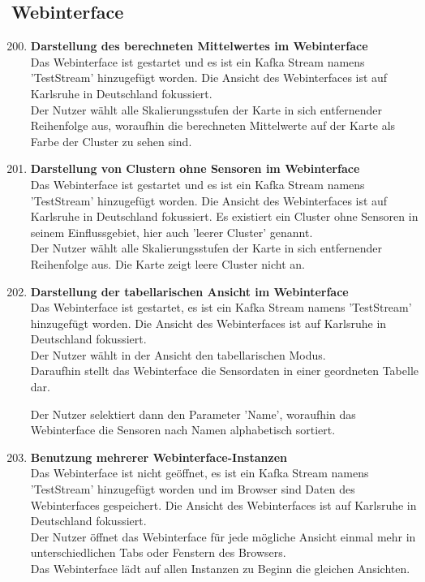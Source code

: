 \subsection{Webinterface}
\begin{enumerate}[label=\textbf{TI\arabic{enumi}0}]
	\setcounter{enumi}{199}
	
	\item \textbf{Darstellung des berechneten Mittelwertes im Webinterface}\\
		Das Webinterface ist gestartet und es ist ein Kafka Stream namens 'TestStream' hinzugefügt worden. Die Ansicht des Webinterfaces ist auf Karlsruhe in Deutschland fokussiert.\\
		Der Nutzer wählt alle Skalierungsstufen der Karte in sich entfernender Reihenfolge aus, woraufhin die berechneten Mittelwerte auf der Karte als Farbe der Cluster zu sehen sind.\par
	\item \textbf{Darstellung von Clustern ohne Sensoren im Webinterface}\\
		Das Webinterface ist gestartet und es ist ein Kafka Stream namens 'TestStream' hinzugefügt worden. Die Ansicht des Webinterfaces ist auf Karlsruhe in Deutschland fokussiert. Es existiert ein Cluster ohne Sensoren in seinem Einflussgebiet, hier auch 'leerer Cluster' genannt.\\
		Der Nutzer wählt alle Skalierungsstufen der Karte in sich entfernender Reihenfolge aus. Die Karte zeigt leere Cluster nicht an.\par
	\item \textbf{Darstellung der tabellarischen Ansicht im Webinterface}\\
		Das Webinterface ist gestartet, es ist ein Kafka Stream namens 'TestStream' hinzugefügt worden. Die Ansicht des Webinterfaces ist auf Karlsruhe in Deutschland fokussiert.\\
		Der Nutzer wählt in der Ansicht den tabellarischen Modus.\\
		Daraufhin stellt das Webinterface die Sensordaten in einer geordneten Tabelle dar.\par
		
		Der Nutzer selektiert dann den Parameter 'Name', woraufhin das Webinterface die Sensoren nach Namen alphabetisch sortiert.
	\item \textbf{Benutzung mehrerer Webinterface-Instanzen}\\
		Das Webinterface ist nicht geöffnet, es ist ein Kafka Stream namens 'TestStream' hinzugefügt worden und im Browser sind Daten des Webinterfaces gespeichert. Die Ansicht des Webinterfaces ist auf Karlsruhe in Deutschland fokussiert.\\
		Der Nutzer öffnet das Webinterface für jede mögliche Ansicht einmal mehr in unterschiedlichen Tabs oder Fenstern des Browsers.\\
		Das Webinterface lädt auf allen Instanzen zu Beginn die gleichen Ansichten.\par
		

\end{enumerate}
